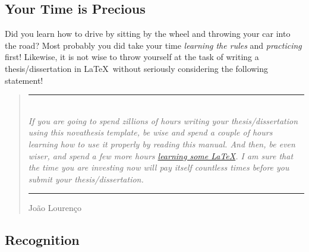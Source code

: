\subsection{Your Time is Precious}
\label{sub:time_is_money}

Did you learn how to drive by sitting by the wheel and throwing your car into the road?  Most probably you did take your time \emph{learning the rules} and \emph{practicing} first! Likewise, it is not wise to throw yourself at the task of writing a thesis/dissertation in \LaTeX\ without seriously considering the following statement!

\bgroup
\renewcommand{\mkcitation}[1]{\\[0ex]\parbox{\linewidth}{\hfill\textbf{#1}}}
\blockquote[João Lourenço]{%
  \rule{\linewidth}{2pt}\\\itshape
  If you are going to spend zillions of hours writing your thesis/dissertation using this \gls{novathesis} template, be wise and spend a couple of hours learning how to use it properly by reading this manual.  And then, be even wiser, and spend a few more hours \href{https://github.com/joaomlourenco/novathesis/wiki\#learning-latex}{learning some \LaTeX}.  I am sure that the time you are investing now will pay itself countless times before you submit your thesis/dissertation.\\\nopagebreak
  \rule{\linewidth}{2pt}%
}
\egroup

\subsection{Recognition}
\label{sub:recognition}


